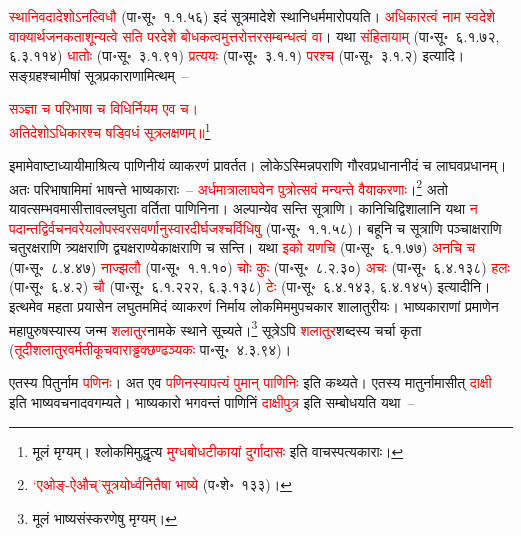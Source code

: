 \begin{sloppypar}
\textcolor{red}{स्थानिवदादेशोऽनल्विधौ} (पा॰सू॰~१.१.५६) इदं सूत्रमादेशे स्थानि\-धर्ममारोपयति। \textcolor{red}{अधिकारत्वं नाम स्व\-देशे वाक्यार्थ\-जनकता\-शून्यत्वे सति पर\-देशे बोधकत्वमुत्तरोत्तर\-सम्बन्धत्वं वा}। यथा \textcolor{red}{संहितायाम्} (पा॰सू॰~६.१.७२, ६.३.११४) \textcolor{red}{धातोः} (पा॰सू॰~३.१.९१) \textcolor{red}{प्रत्ययः} (पा॰सू॰~३.१.१) \textcolor{red}{परश्च} (पा॰सू॰~३.१.२) इत्यादि। सङ्ग्रहश्चामीषां सूत्र\-प्रकाराणामित्थम्~–\end{sloppypar}
\centering\textcolor{red}{सञ्ज्ञा च परिभाषा च विधिर्नियम एव च। \nopagebreak\\
अतिदेशोऽधिकारश्च षड्विधं सूत्रलक्षणम्॥}\footnote{मूलं मृग्यम्। श्लोकमिमुद्धृत्य \textcolor{red}{मुग्धबोधटीकायां दुर्गादासः} इति वाचस्पत्य\-काराः।}\\
\begin{sloppypar}\justifying\noindent\hspace{10mm} इमामेवाष्टाध्यायीमाश्रित्य पाणिनीयं व्याकरणं प्रावर्तत। लोकेऽस्मिन्नपराणि गौरव\-प्रधानानीदं च लाघव\-प्रधानम्। अतः परिभाषामिमां भाषन्ते भाष्यकाराः~– \textcolor{red}{अर्धमात्रालाघवेन पुत्रोत्सवं मन्यन्ते वैयाकरणाः}।\footnote{\textcolor{red}{‘एओङ्-ऐऔच्’सूत्रयोर्ध्वनितैषा भाष्ये} (प॰शे॰~१३३)।} अतो यावत्सम्भवमासीत्तावल्लघुता वर्तिता पाणिनिना। अल्पान्येव सन्ति सूत्राणि। कानिचिद्विशालानि यथा \textcolor{red}{न पदान्त\-द्विर्वचन\-वरेय\-लोप\-स्वर\-सवर्णानुस्वार\-दीर्घ\-जश्चर्विधिषु} (पा॰सू॰~१.१.५८)। बहूनि च सूत्राणि पञ्चाक्षराणि चतुरक्षराणि त्र्यक्षराणि द्व्यक्षराण्येकाक्षराणि च सन्ति। यथा \textcolor{red}{इको यणचि} (पा॰सू॰~६.१.७७) \textcolor{red}{अनचि च} (पा॰सू॰~८.४.४७) \textcolor{red}{नाज्झलौ} (पा॰सू॰~१.१.१०) \textcolor{red}{चोः कुः} (पा॰सू॰~८.२.३०) \textcolor{red}{अचः} (पा॰सू॰~६.४.१३८) \textcolor{red}{हलः} (पा॰सू॰~६.४.२) \textcolor{red}{चौ} (पा॰सू॰~६.१.२२२, ६.३.१३८) \textcolor{red}{टेः} (पा॰सू॰~६.४.१४३, ६.४.१४५) इत्यादीनि। इत्थमेव महता प्रयासेन लघु\-तममिदं व्याकरणं निर्माय लोकमिममुप\-चकार शालातुरीयः। भाष्यकाराणां प्रमाणेन महापुरुषस्यास्य जन्म \textcolor{red}{शलातुर}\-नामके स्थाने सूच्यते।\footnote{मूलं भाष्य\-संस्करणेषु मृग्यम्।} सूत्रेऽपि \textcolor{red}{शलातुर}\-शब्दस्य चर्चा कृता (\textcolor{red}{तूदी\-शलातुर\-वर्मती\-कूच\-वाराड्ढक्छण्ढञ्यकः} पा॰सू॰~४.३.९४)।\end{sloppypar}
\begin{sloppypar}\justifying\noindent\hspace{10mm} एतस्य पितुर्नाम \textcolor{red}{पणिनः}। अत एव \textcolor{red}{पणिनस्यापत्यं पुमान् पाणिनिः} इति कथ्यते। एतस्य मातुर्नामासीत् \textcolor{red}{दाक्षी} इति भाष्य\-वचनादवगम्यते। भाष्य\-कारो भगवन्तं पाणिनिं \textcolor{red}{दाक्षीपुत्र} इति सम्बोधयति यथा~–\end{sloppypar}
